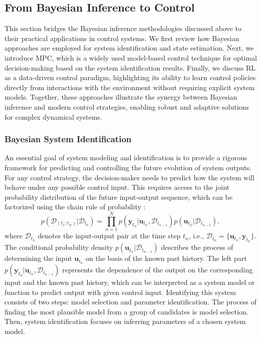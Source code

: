 \subsection{From Bayesian Inference to Control}
This section bridges the Bayesian inference methodologies discussed above to their practical applications in control systems. We first review how Bayesian approaches are employed for system identification and state estimation. Next, we introduce \acf{MPC}, which is a widely used model-based control technique for optimal decision-making based on the system identification results. Finally, we discuss \acf{RL} as a data-driven control paradigm, highlighting its ability to learn control policies directly from interactions with the environment without requiring explicit system models. Together, these approaches illustrate the synergy between Bayesian inference and modern control strategies, enabling robust and adaptive solutions for complex dynamical systems.

\subsubsection{Bayesian System Identification}
An essential goal of system modeling and identification is to provide a rigorous framework for predicting and controlling the future evolution of system outputs. For any control strategy, the decision-maker needs to predict how the system will behave under any possible control input. This requires access to the joint probability distribution of the future input-output sequence, which can be factorized using the chain rule of probability \citep{BayesSysId1981}:
\begin{equation}
    p(\mathcal{D}_{(t_1:t_N)}|\mathcal{D}_{t_0})=\prod _{n=1}^{N}p(\boldsymbol{y}_{t_n}|\boldsymbol{u}_{t_n}, \mathcal{D}_{t_{n-1}})p(\boldsymbol{u}_{t_n}|\mathcal{D}_{t_{n-1}}),
\end{equation}
where $\mathcal{D}_{t_n}$ denotes the input-output pair at the time step $t_n$, i.e., $\mathcal{D}_{t_n}=\{\boldsymbol{u}_{t_n}, \boldsymbol{y}_{t_n}\}$.
The conditional probability density $p(\boldsymbol{u}_{t_n}|\mathcal{D}_{t_{n-1}})$ describes the process of determining the input $\boldsymbol{u}_{t_n}$ on the basis of the known past history. The left part $p(\boldsymbol{y}_{t_n}|\boldsymbol{u}_{t_n}, \mathcal{D}_{t_{n-1}})$ represents the dependence of the output on the corresponding input and the known past history, which can be interpreted as a system model or function to predict output with given control input. Identifying this system consists of two steps: model selection and parameter identification. The process of finding the most plausible model from a group of candidates is model selection. Then, system identification focuses on inferring parameters of a chosen system model.
